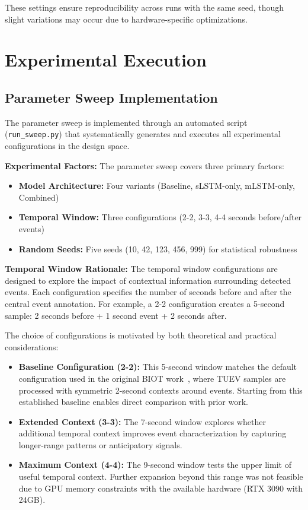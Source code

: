 These settings ensure reproducibility across runs with the same seed, though slight variations may occur due to hardware-specific optimizations.


\section{Experimental Execution}
\label{sec:experimental_execution}

\subsection{Parameter Sweep Implementation}
\label{sec:sweep_implementation}

The parameter sweep is implemented through an automated script (\texttt{run\_sweep.py}) that systematically generates and executes all experimental configurations in the design space.

\textbf{Experimental Factors:} The parameter sweep covers three primary factors:
\begin{itemize}
    \item \textbf{Model Architecture:} Four variants (Baseline, sLSTM-only, mLSTM-only, Combined)
    \item \textbf{Temporal Window:} Three configurations (2-2, 3-3, 4-4 seconds before/after events)
    \item \textbf{Random Seeds:} Five seeds (10, 42, 123, 456, 999) for statistical robustness
\end{itemize}

\textbf{Temporal Window Rationale:} The temporal window configurations are designed to explore the impact of contextual information surrounding detected events. Each configuration specifies the number of seconds before and after the central event annotation. For example, a 2-2 configuration creates a 5-second sample: 2 seconds before + 1 second event + 2 seconds after.

The choice of configurations is motivated by both theoretical and practical considerations:
\begin{itemize}
    \item \textbf{Baseline Configuration (2-2):} This 5-second window matches the default configuration used in the original \ac{BIOT} work~\cite{yang2023biot}, where \ac{TUEV} samples are processed with symmetric 2-second contexts around events. Starting from this established baseline enables direct comparison with prior work.
    \item \textbf{Extended Context (3-3):} The 7-second window explores whether additional temporal context improves event characterization by capturing longer-range patterns or anticipatory signals.
    \item \textbf{Maximum Context (4-4):} The 9-second window tests the upper limit of useful temporal context. Further expansion beyond this range was not feasible due to \ac{GPU} memory constraints with the available hardware (RTX 3090 with 24GB).
\end{itemize}

